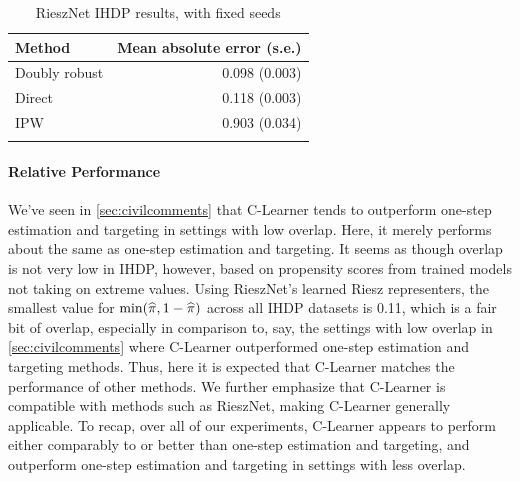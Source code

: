 \begin{table}[H]
\centering
\footnotesize
\begin{tabular}{lr}
\toprule
Method & Mean absolute error (s.e.) \\
 \midrule 
Doubly robust & 0.098 (0.003) \\
Direct & 0.118 (0.003) \\
IPW & 0.903 (0.034) \\
\bottomrule
\vspace{0.05em}
\end{tabular}
\caption{RieszNet IHDP results, with fixed seeds}
    \label{tab:ihdp_seeds}
\end{table}


\paragraph{Relative Performance}
We've seen in \cref{sec:civilcomments} that C-Learner tends to outperform one-step estimation and targeting in settings with low overlap. Here, it merely performs about the same as one-step estimation and targeting. It seems as though overlap is not very low in IHDP, however, based on propensity scores from trained models not taking on extreme values. 
Using RieszNet's learned Riesz representers, the smallest value for $\textrm{min}(\widehat{\pi},1-\widehat{\pi})$ across all IHDP datasets is 0.11, which is a fair bit of overlap, especially in comparison to, say, the settings with low overlap in \cref{sec:civilcomments} where C-Learner outperformed one-step estimation and targeting methods. 
Thus, here it is expected that C-Learner matches the performance of other methods. We further emphasize that C-Learner is compatible with methods such as RieszNet, making C-Learner generally applicable.
To recap, over all of our experiments, C-Learner appears to perform either comparably to or better than one-step estimation and targeting, and outperform one-step estimation and targeting in settings with less overlap. 




\fi
